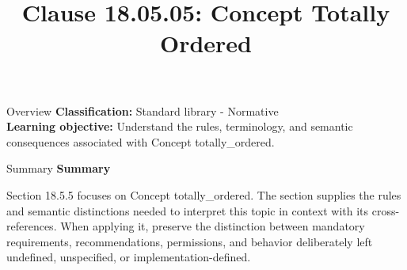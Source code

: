 \documentclass[10pt,letterpaper]{article}
\title{Clause 18.05.05: Concept Totally Ordered}
\author{}
\date{}
\begin{document}
\maketitle
\begin{CornellOverviewBox}{Overview}
\textbf{Classification:} Standard library - Normative\\[2pt]
\textbf{Learning objective:} Understand the rules, terminology, and semantic consequences associated with Concept totally\_ordered.
\end{CornellOverviewBox}\begin{CornellSummaryBox}{Summary}
{\sffamily\bfseries\color{Accent} Summary}\par\vspace{3pt}Section 18.5.5 focuses on Concept totally\_ordered. The section supplies the rules and semantic distinctions needed to interpret this topic in context with its cross-references. When applying it, preserve the distinction between mandatory requirements, recommendations, permissions, and behavior deliberately left undefined, unspecified, or implementation-defined.
\end{CornellSummaryBox}
\end{document}
